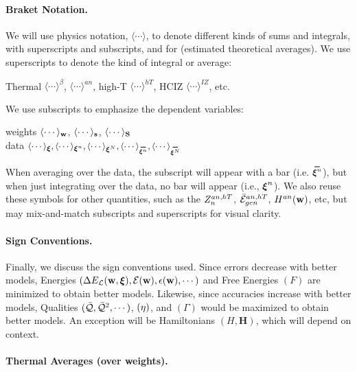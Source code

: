 \paragraph{Braket Notation.}
We will use physics \BraKet notation, $\langle\cdots\rangle$,
to denote different kinds of sums and integrals, with superscripts and subscripts,
and for \ExpectedValues (estimated theoretical averages).
We use superscripts to denote the kind of integral or average:
\begin{center}
Thermal $\langle\cdots\rangle^{\beta}$,
\Annealed $\langle\cdots\rangle^{an}$,
high-T $\langle\cdots\rangle^{hT}$,
HCIZ $\langle\cdots\rangle^{IZ}$, etc.
\end{center}
We use subscripts to emphasize the dependent variables:
\begin{center}
  weights $\langle\cdots\rangle_{{\mathbf{w}}}$, $\langle\cdots\rangle_{{\mathbf{s}}}$, $\langle\cdots\rangle_{{\mathbf{S}}}$ \\ \nonumber
    \vspace{0.33cm}  %
data $\langle\cdots\rangle_{\XI},
\langle\cdots\rangle_{\NDXIn},
\langle\cdots\rangle_{\NDXI},
\langle\cdots\rangle_{\AVGNDXIn},
\langle\cdots\rangle_{\AVGNDXI}$
\end{center}
When averaging over the data, the subscript will appear with a bar (i.e. $\AVGNDXIn$), but when just integrating over the data, no bar will appear (i.e., $\boldsymbol{\xi}^{n}$). 
We also reuse these symbols for other quantities, such as the $Z^{an,hT}_{n}$, $\bar{\mathcal{E}}_{gen}^{an,hT}$, $H^{an}({\mathbf{w}})$, etc,
but may mix-and-match subscripts and superscripts for visual clarity.

\paragraph{Sign Conventions.}
Finally, we discuss the sign conventions used.  Since errors decrease with better models,
Energies $(\Delta E_{\mathcal{L}}(\mathbf{w},\boldsymbol{\xi}), \mathcal{E}(\mathbf{w}), \epsilon({\mathbf{w}}), \cdots)$ and Free Energies $(F)$ are minimized to obtain better models.
Likewise, since accuracies increase with better models, Qualities $(\bar{\mathcal{Q}}, \bar{\mathcal{Q}}^{2}, \cdots)$,
\SelfOverlap $(\eta)$, and \Quality \GeneratingFunction $(\Gamma)$ would be maximized to obtain better models.
An exception will be Hamiltonians $(H,\mathbf{H})$, which will depend on context.

\paragraph{Thermal Averages (over weights).}

